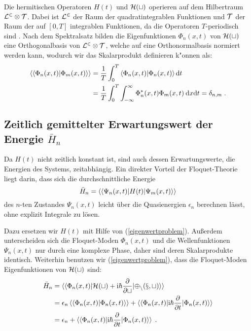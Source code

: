   Die hermitischen Operatoren $H(t)$ und $\cal H(t)$ operieren auf dem Hilbertraum $\cal{L}^2 \otimes \cal{T}$.
  Dabei ist $\cal{L}^2$ der Raum der quadratintegrablen Funktionen und $\cal{T}$ der Raum der auf $[0,T]$ integrablen Funktionen, da die Operatoren $T$-periodisch sind \cite{haenggi}.
  Nach dem Spektralsatz bilden die Eigenfunktionen $\Phi_n(x,t)$ von $\cal{H}(t)$ eine Orthogonalbasis von $\cal{L}^2 \otimes \cal{T}$, welche auf eine Orthonormalbasis normiert werden kann, wodurch wir das Skalarprodukt definieren k"onnen als:
  \begin{align}
    \begin{split}
    \braket{\braket{\Phi_n(x,t)|\Phi_m(x,t)}} &= \frac{1}{T} \int_0^T \braket{\Phi_n(x,t)|\Phi_n(x,t)} \text{d}t \\
    &= \frac{1}{T} \int_0^T \int_{-\infty}^{\infty} \Phi_n^*(x,t)\Phi_m(x,t) \: \text{d}x\text{d}t = \delta_{n,m} \; .
    \label{skalarprodukt_einzelner}
    \end{split}
  \end{align}



  \subsection{\texorpdfstring{Zeitlich gemittelter Erwartungswert der Energie $\bar{H}_n$}{Zeitlich gemittelter Erwartungswert der Energie bar{H}_n}}

    Da $H(t)$ nicht zeitlich konstant ist, sind auch dessen Erwartungswerte, die Energien des Systems, zeitabhängig.
    Ein direkter Vorteil der Floquet-Theorie liegt darin, dass sich die durchschnittliche Energie
    \begin{equation}
      \bar{H}_n  = \braket{\braket{\Psi_n(x,t)|H(t)|\Psi_m(x,t)}}
    \end{equation}
    des $n$-ten Zustandes $\Psi_n(x,t)$ leicht über die Quasienergien $\epsilon_n$ berechnen lässt, ohne explizit Integrale zu lösen.

    Dazu ersetzen wir $H(t)$ mit Hilfe von (\ref{eigenwertproblem}).
    Außerdem unterscheiden sich die Floquet-Moden $\Phi_n(x,t)$ und die Wellenfunktionen $\Psi_n(x,t)$ nur durch eine komplexe Phase, daher sind deren Skalarprodukte identisch.
    Weiterhin benutzen wir (\ref{eigenwertproblem}), dass die Floquet-Moden Eigenfunktionen von $\cal{H}(t)$ sind:
    \begin{align}
      \begin{split}
      \bar{H}_n  &= \braket{\braket{\Phi_n(x,t)|\cal{H}(t)+\text{i}\hbar\frac{\partial}{\partial t}|\Phi_n(x,t)}} \\
      &=\epsilon_n \braket{\braket{\Phi_n(x,t)|\Phi_n(x,t)}} + \braket{\braket{\Phi_n(x,t)|\text{i}\hbar\frac{\partial}{\partial t}|\Phi_n(x,t)}} \\
      &= \epsilon_n + \braket{\braket{\Phi_n(x,t)|\text{i}\hbar\frac{\partial}{\partial t}|\Phi_n(x,t)}} \; .
    \end{split}
    \end{align}


